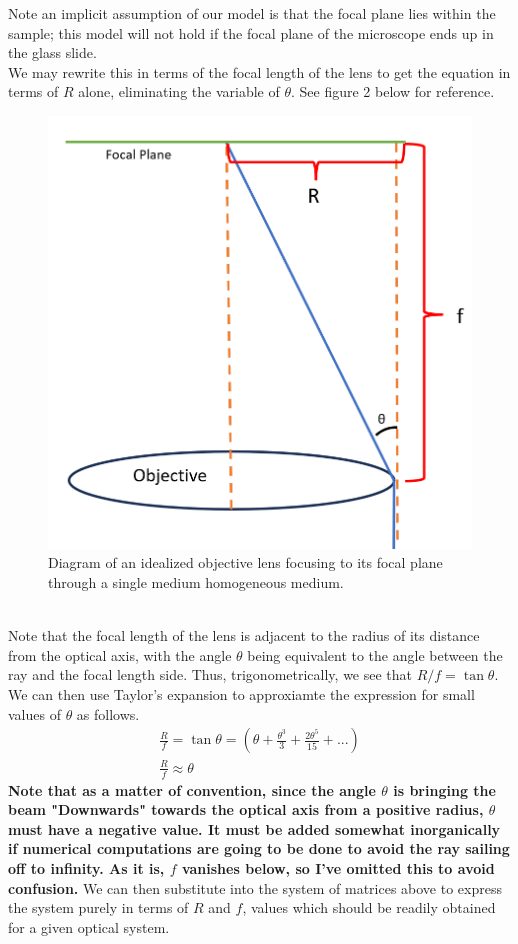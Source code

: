 Note an implicit assumption of our model is that the focal plane lies within the sample; this model will not hold if the focal plane of the microscope ends up in the glass slide. 
\\We may rewrite this in terms of the focal length of the lens to get the equation in terms of $R$ alone, eliminating the variable of $\theta$. See figure 2 below for reference.
\begin{figure}[h]
    \centering
    \includegraphics[width=0.3 \linewidth]{image2.png}
    \caption{Diagram of an idealized objective lens focusing to its focal plane through a single medium homogeneous medium.}
    \label{fig:enter-label}
\end{figure}
\\Note that the focal length of the lens is adjacent to the radius of its distance from the optical axis, with the angle $\theta$ being equivalent to the angle between the ray and the focal length side. Thus, trigonometrically, we see that $R / f= \tan \theta$. We can then use Taylor's expansion to approxiamte the expression for small values of $\theta$ as follows.
\begin{gather}
    \frac R f=\tan \theta= \left(\theta + \frac{\theta^3}{3} + \frac{2 \theta ^5}{15}+...\right)\\
    \frac R f \approx \theta 
\end{gather}
\textbf{Note that as a matter of convention, since the angle $\theta$ is bringing the beam "Downwards" towards the optical axis from a positive radius, $\theta$ must have a negative value. It must be added somewhat inorganically if numerical computations are going to be done to avoid the ray sailing off to infinity. As it is, $f$ vanishes below, so I've  omitted this to avoid confusion.}
We can then substitute into the system of matrices above to express the system purely in terms of $R$ and $f$, values which should be readily obtained for a given optical system.
